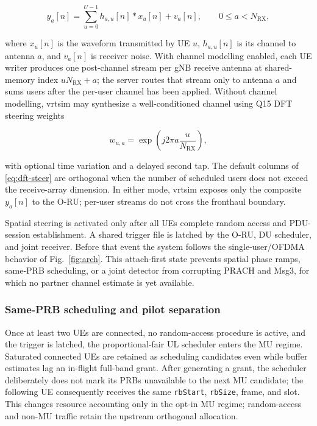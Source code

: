 \documentclass[11pt,a4paper]{article}
\begin{document}
\begin{equation}
  y_a[n] = \sum_{u=0}^{U-1} h_{a,u}[n] \ast x_u[n] + v_a[n],
  \qquad 0\leq a<N_{\mathrm{RX}},
  \label{eq:mu-air}
\end{equation}

where $x_u[n]$ is the waveform transmitted by UE $u$, $h_{a,u}[n]$ is its channel to antenna
$a$, and $v_a[n]$ is receiver noise.  With channel modelling enabled, each UE writer produces
one post-channel stream per gNB receive antenna at shared-memory index
$uN_{\mathrm{RX}}+a$; the server routes that stream only to antenna $a$ and sums users after
the per-user channel has been applied.  Without channel modelling, vrtsim may synthesize a
well-conditioned channel using Q15 DFT steering weights

\begin{equation}
  w_{u,a}=\exp\!\left(j2\pi a\frac{u}{N_{\mathrm{RX}}}\right),
  \label{eq:dft-steer}
\end{equation}

with optional time variation and a delayed second tap.  The default columns of
\eqref{eq:dft-steer} are orthogonal when the number of scheduled users does not exceed the
receive-array dimension.  In either mode, vrtsim exposes only the composite $y_a[n]$ to the
O-RU; per-user streams do not cross the fronthaul boundary.

Spatial steering is activated only after all UEs complete random access and PDU-session
establishment.  A shared trigger file is latched by the O-RU, DU scheduler, and joint receiver.
Before that event the system follows the single-user/OFDMA behavior of Fig.~\ref{fig:arch}.
This attach-first state prevents spatial phase ramps, same-PRB scheduling, or a joint detector
from corrupting PRACH and Msg3, for which no partner channel estimate is yet available.

\subsubsection{Same-PRB scheduling and pilot separation}

Once at least two UEs are connected, no random-access procedure is active, and the trigger is
latched, the proportional-fair UL scheduler enters the MU regime.  Saturated connected UEs are
retained as scheduling candidates even while buffer estimates lag an in-flight full-band grant.
After generating a grant, the scheduler deliberately does not mark its PRBs unavailable to the
next MU candidate; the following UE consequently receives the same \texttt{rbStart},
\texttt{rbSize}, frame, and slot.  This changes resource accounting only in the opt-in MU regime;
random-access and non-MU traffic retain the upstream orthogonal allocation.
\end{document}
